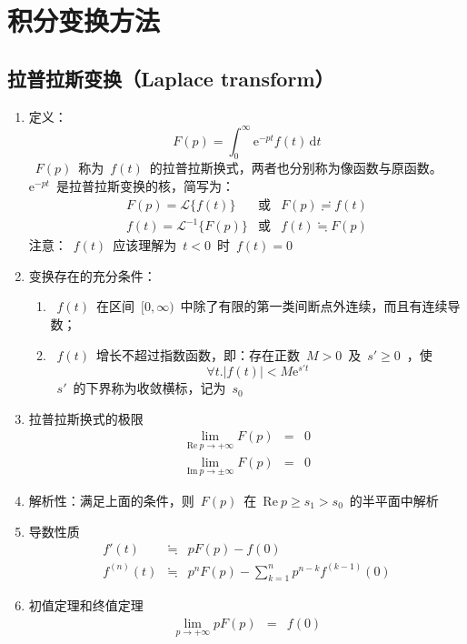 \documentclass[12pt,a4paper]{article}
\newcommand\diff{\,\mathrm{d}}
\renewcommand{\[}{\ $\displaystyle}
\renewcommand{\]}{$\ }%
\newcommand\e{\mathrm{e}}
\begin{document}
\section{积分变换方法}
	\subsection{拉普拉斯变换（Laplace transform）}
	 \begin{enumerate}
	 \newcommand{\re}{\mathrm{Re}~}
	   \item 定义：
	   	$$
	   	  F(p) = \int_0^\infty\e^{-pt}f(t)\diff t
	   	$$
	   	\[F(p)\]称为\[f(t)\]的拉普拉斯换式，两者也分别称为像函数与原函数。\[\e^{-pt}\]是拉普拉斯变换的核，简写为：
	   	\begin{eqnarray*}
	   	 F(p) = \mathscr{L}\{f(t)\} &\mbox{或}& F(p)\risingdotseq f(t) \\
	   	 f(t) = \mathscr{L}^{-1}\{F(p)\} &\mbox{或}& f(t)\fallingdotseq F(p)
	   	\end{eqnarray*}
	   	注意：\[f(t)\]应该理解为\[t<0\]时\[f(t)=0\]
	   \item 变换存在的充分条件：
	   		\begin{enumerate}
	   		 \item \[f(t)\]在区间\[ [0 , \infty)\]中除了有限的第一类间断点外连续，而且有连续导数；
	   		 \item \[f(t)\]增长不超过指数函数，即：存在正数\[M>0\]及\[s'\ge 0\]，使
	   		 	$$
	   		 	  \forall t. |f(t)|<M\e^{s't}
	   		 	$$
	   		 	\[s'\]的下界称为收敛横标，记为\[s_0\]
	   		\end{enumerate}
	   \item 拉普拉斯换式的极限
	   	\begin{eqnarray*}	   		
	   		\lim_{\re p\to+\infty} F(p) &=& 0 \\
	   		\lim_{\mathrm{Im}~p\to \pm\infty}F(p) &=& 0
	   	\end{eqnarray*}
	   \item 解析性：满足上面的条件，则\[F(p)\]在\[\re p\ge s_1>s_0\]的半平面中解析
	   \item 导数性质
	   	\begin{eqnarray*}
	   		f'(t)&\fallingdotseq & pF(p) - f(0)\\
	   		f^{(n)}(t) &\fallingdotseq & p^n F(p) - \sum_{k=1}^{n}p^{n-k}f^{(k-1)}(0)
	   	\end{eqnarray*}
	   \item 初值定理和终值定理
	   	\begin{eqnarray*}
	   	 \lim_{p\to+\infty}pF(p) &=& f(0)\\

\end{eqnarray*}
\end{enumerate}
\end{document}
